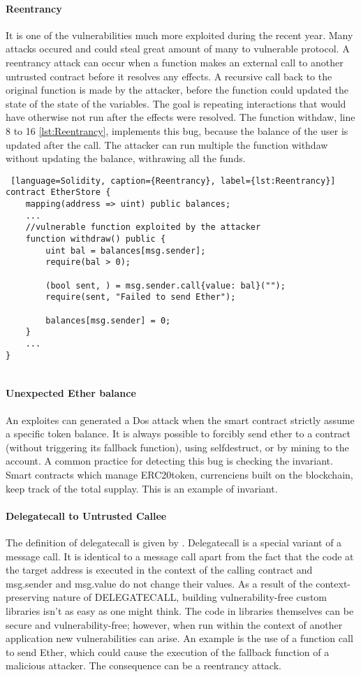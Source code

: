 \documentclass[a4paper,sigconf, language=french,
language=german, language=spanish, language=english]{acmart}
\begin{document}
\paragraph{Reentrancy} It is one of the vulnerabilities much more exploited during the recent year. 
Many attacks occured and could steal great amount of many to vulnerable protocol. 
A reentrancy attack can occur when a function makes an external call to another untrusted contract 
before it resolves any effects. 
A recursive call back to the original function is made by the attacker, before 
the function could updated the state of the state of the variables. 
The goal is repeating interactions that would have otherwise not run after the effects were resolved. 
The function withdaw, line 8 to 16 \autoref{lst:Reentrancy}, implements this bug, because the balance of the user is updated after the call. 
The attacker can run multiple the function withdaw without updating the balance, withrawing all the funds.
\begin{lstlisting} [language=Solidity, caption={Reentrancy}, label={lst:Reentrancy}]
contract EtherStore {
    mapping(address => uint) public balances;
    ...
    //vulnerable function exploited by the attacker
    function withdraw() public {
        uint bal = balances[msg.sender];
        require(bal > 0);

        (bool sent, ) = msg.sender.call{value: bal}("");
        require(sent, "Failed to send Ether");

        balances[msg.sender] = 0;
    }
    ...
}
  
\end{lstlisting}
\paragraph{Unexpected Ether balance} An exploites can generated a Dos attack when the smart contract strictly assume a specific token balance. 
It is always possible to forcibly send ether to a contract (without triggering its fallback function), using selfdestruct, or by mining to the account. 
A common practice for detecting this bug is checking the invariant. 
Smart contracts which manage ERC20token, currenciens built on the blockchain, keep track of the total supplay. 
This is an example of invariant.

\paragraph{Delegatecall to Untrusted Callee} The definition of delegatecall is given by \cite{SolDocs}. 
Delegatecall is a special variant of a message call. 
It is identical to a message call apart from the fact that the code at the target address is executed in the context of the calling contract and msg.sender and msg.value do not change their values.
As a result of the context-preserving nature of DELEGATECALL, building vulnerability-free custom libraries isn't as easy as one might think. 
The code in libraries themselves can be secure and vulnerability-free; however, when run within the context of another application new vulnerabilities can arise.
An example is the use of a function call to send Ether, which could cause the execution of the
fallback function of a malicious attacker. The consequence can be a reentrancy attack.
\end{document}
